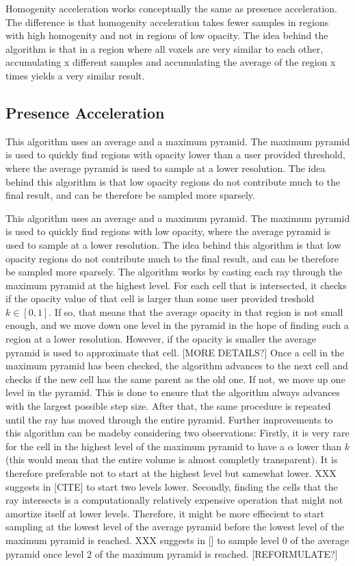 Homogenity acceleration works conceptually the same as presence acceleration. The difference is that homogenity acceleration takes fewer samples in regions with high homogenity and not in regions of low opacity. The idea behind the algorithm is that in a region where all voxels are very similar to each other, accumulating x different samples and accumulating the average of the region x times yields a very similar result.
\subsection{Presence Acceleration}
This algorithm uses an average and a maximum pyramid. The maximum pyramid is used to quickly find regions with opacity lower than a user provided threshold, where the average pyramid is used to sample at a lower resolution. The idea behind this algorithm is that low opacity regions do not contribute much to the final result, and can be therefore be sampled more sparsely.

This algorithm uses an average and a maximum pyramid. The maximum pyramid is used to quickly find regions with low opacity, where the average pyramid is used to sample at a lower resolution. The idea behind this algorithm is that low opacity regions do not contribute much to the final result, and can be therefore be sampled more sparsely.
The algorithm works by casting each ray through the maximum pyramid at the highest level. For each cell that is intersected, it checks if the opacity value of that cell is larger than some user provided treshold $k \in [0, 1]$.
If so, that means that the average opacity in that region is not small enough, and we move down one level in the pyramid in the hope of finding such a region at a lower resolution.
However, if the opacity is smaller the average pyramid is used to approximate that cell. [MORE DETAILS?]
Once a cell in the maximum pyramid has been checked, the algorithm advances to the next cell and checks if the new cell has the same parent as the old one. If not, we move up one level in the pyramid. This is done to ensure that the algorithm always advances with the largest possible step size.
After that, the same procedure is repeated until the ray has moved through the entire pyramid.
Further improvements to this algorithm can be madeby considering two observations:
Firstly, it is very rare for the cell in the highest level of the maximum pyramid to have a $\alpha$ lower than $k$ (this would mean that the entire volume is almost completly transparent). It is therefore preferable not to start at the highest level but samewhat lower. XXX suggests in [CITE] to start two levels lower.
Secondly, finding the cells that the ray intersects is a computationally relatively expensive operation that might not amortize itself at lower levels. Therefore, it might be more effiecient to start sampling at the lowest level of the average pyramid before the lowest level of the maximum pyramid is reached. XXX suggests in [] to sample level 0  of the average pyramid once level 2 of the maximum pyramid is reached. [REFORMULATE?]



